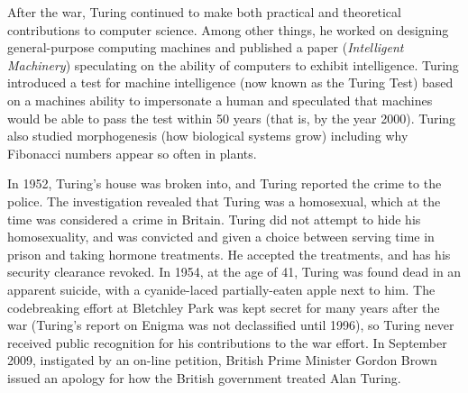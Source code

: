 \begin{schemeregion}
{After the war, Turing continued to make both practical and theoretical contributions to computer science.  Among other things, he worked on designing general-purpose computing machines and published a paper (\emph{Intelligent Machinery}) speculating on the ability of computers to exhibit intelligence.  Turing introduced a test for machine intelligence (now known as the Turing Test) based on a machines ability to impersonate a human and speculated that machines would be able to pass the test within 50 years (that is, by the year 2000).  Turing also studied morphogenesis (how biological systems grow) including why Fibonacci numbers appear so often in plants.

In 1952, Turing's house was broken into, and Turing reported the crime to the police.  The investigation revealed that Turing was a homosexual, which at the time was considered a crime in Britain.  Turing did not attempt to hide his homosexuality, and was convicted and given a choice between serving time in prison and taking hormone treatments. He accepted the treatments, and has his security clearance revoked.  In 1954, at the age of 41, Turing was found dead in an apparent suicide, with a cyanide-laced partially-eaten apple next to him.  The codebreaking effort at Bletchley Park was kept secret for many years after the war (Turing's report on Enigma was not declassified until 1996), so Turing never received public recognition for his contributions to the war effort.  In September 2009, instigated by an on-line petition, British Prime Minister Gordon Brown issued an apology for how the British government treated Alan Turing.
}





\end{schemeregion}
